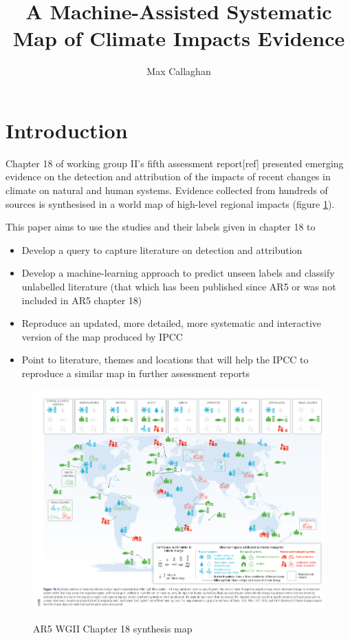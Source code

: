 \documentclass{article}
\makeatletter
\renewcommand{\maketitle}{\bgroup\setlength{\parindent}{0pt}
	\begin{flushleft}
		
		{\huge\textbf{\@title}}
		
		\bigskip
		
		{\large\textbf{\@author}}
		
		\bigskip
		
		
	\end{flushleft}\egroup
}
\makeatother
\begin{document}
	\title{A Machine-Assisted Systematic Map of Climate Impacts Evidence}
	\author[1,2]{Max Callaghan}
	
	\maketitle

	\section{Introduction}
	
	Chapter 18 of working group II's fifth assessment report[ref] presented emerging evidence on the detection and attribution of the impacts of recent changes in climate on natural and human systems. Evidence  collected from hundreds of sources is synthesised in a world map of high-level regional impacts (figure \ref{map}).
	
	This paper aims to use the studies and their labels given in chapter 18 to 
	\begin{itemize}
		\item Develop a query to capture literature on detection and attribution
		\item Develop a machine-learning approach to predict unseen labels and classify unlabelled literature (that which has been published since AR5 or was not included in AR5 chapter 18)
		\item Reproduce an updated, more detailed, more systematic and interactive version of the map produced by IPCC
		\item Point to literature, themes and locations that will help the IPCC to reproduce a similar map in further assessment reports 
	\end{itemize}
	
	
	
	\begin{figure}
		\begin{center}
		\includegraphics[width=0.7\linewidth]{map_18.png}
		\label{map}
		\end{center}
		\caption{AR5 WGII Chapter 18 synthesis map}
	\end{figure}
\end{document}
